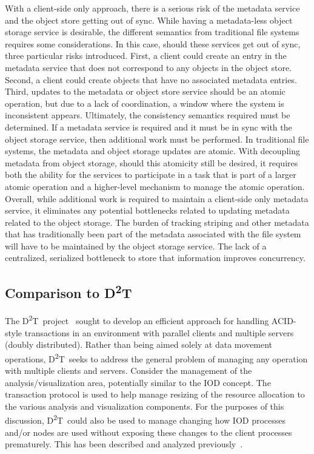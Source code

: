 \documentclass[conference]{IEEEtran}
\newcommand{\DDT}{D\textsuperscript{2}T~}
\newcommand{\DDTns}{D\textsuperscript{2}T}
\begin{document}
With a client-side only approach, there is a serious risk of the metadata
service and the object store getting out of sync.  While having a metadata-less
object storage service is desirable, the different semantics from traditional
file systems requires some considerations. In this case, should these services
get out of sync, three particular risks introduced.  First, a client could
create an entry in the metadata service that does not correspond to any objects
in the object store. Second, a client could create objects that have no
associated metadata entries. Third, updates to the metadata or object store
service should be an atomic operation, but due to a lack of coordination, a
window where the system is inconsistent appears.  Ultimately, the consistency
semantics required must be determined. If a metadata service is required and it
must be in sync with the object storage service, then additional work must be
performed. In traditional file systems, the metadata and object storage updates
are atomic. With decoupling metadata from object storage, should this atomicity
still be desired, it requires both the ability for the services to participate
in a task that is part of a larger atomic operation and a higher-level
mechanism to manage the atomic operation. Overall, while additional work is
required to maintain a client-side only metadata service, it eliminates any
potential bottlenecks related to updating metadata related to the object
storage. The burden of tracking striping and other metadata that has
traditionally been part of the metadata associated with the file system will
have to be maintained by the object storage service. The lack of a centralized,
serialized bottleneck to store that information improves concurrency.

\subsection{Comparison to \DDTns}
The \DDT project~\cite{lofstead:2012:txn} sought to develop an efficient
approach for handling ACID-style transactions in an environment with parallel
clients and multiple servers (doubly distributed). Rather than being aimed
solely at data movement operations, \DDT seeks to address the general problem
of managing any operation with multiple clients and servers.  Consider the
management of the analysis/visualization area, potentially similar to the IOD
concept. The transaction protocol is used to help manage resizing of the
resource allocation to the various analysis and visualization components.  For
the purposes of this discussion, \DDT could also be used to manage changing how
IOD processes and/or nodes are used without exposing these changes to the
client processes prematurely.  This has been described and analyzed
previously~\cite{dayal:2013:io-containers}.
\end{document}
